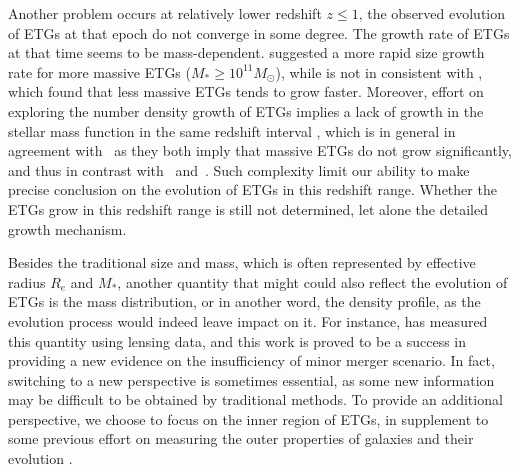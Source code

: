 \documentclass[fleqn,usenatbib]{mnras}
\begin{document}
\par Another problem occurs at relatively lower redshift $z \leq 1$, the observed evolution of ETGs at that epoch do not converge in some degree. The growth rate of ETGs at that time  seems to be mass-dependent. \cite{vanderwel3DHSTCANDELSEvolution2014,KiDs_Roy} suggested a more rapid size growth rate for more massive ETGs ($M_* \geq 10^{11} M_\odot$), while is not in consistent with \cite{damjanov2019}, which found that less massive ETGs tends to grow faster. Moreover, effort on exploring the number density growth of ETGs implies a lack of growth in the stellar mass function in the same redshift interval \citep[e.g.][]{Bundy2017,Kawinwanichakij2020}, which is in general in agreement with~\cite{damjanov2019} as they both imply that massive ETGs do not grow significantly, and thus in contrast with~\cite{vanderwel3DHSTCANDELSEvolution2014} and~\cite{KiDs_Roy}. Such complexity limit our ability to make precise conclusion on the evolution of ETGs in this redshift range. Whether the ETGs grow in this redshift range is still not determined, let alone the detailed growth mechanism. 
\par Besides the traditional size and mass, which is often represented by effective radius $R_e$ and $M_*$, another quantity that might could also reflect the evolution of ETGs is the mass distribution, or in another word, the density profile, as the evolution process would indeed leave impact on it. For instance, \cite{sonnenfeld2014} has measured this quantity using lensing data, and this work is proved to be a success in providing a new evidence on the insufficiency of minor merger scenario. In fact, switching to a new perspective is sometimes essential, as some new information may be difficult to be obtained by traditional methods. To provide an additional perspective, we choose to focus on the inner region of ETGs, in supplement to some previous effort on measuring the outer properties of galaxies and their evolution \citep[e.g.][]{Huang2020}. 

\end{document}
